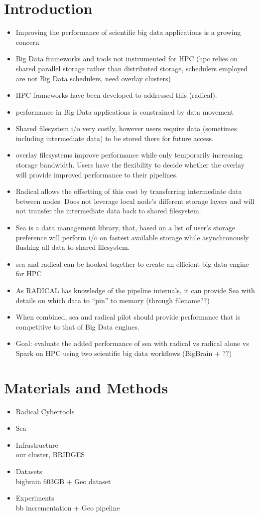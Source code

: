 \documentclass[conference]{IEEEtran}
\begin{document}
\section{Introduction}
\begin{itemize}
\item Improving the performance of scientific big data applications is a growing 
    concern
\item Big Data frameworks and tools not instrumented for HPC (hpc relies on 
    shared parallel storage rather than distributed storage, schedulers employed 
are not Big Data schedulers, need overlay clusters)
\item HPC frameworks have been developed to addressed this (radical).
\item performance in Big Data applications is constrained by data movement
\item Shared filesystem i/o very costly, however users require data (sometimes 
    including intermediate data) to be stored there for future access.
\item overlay filesystems improve performance while only temporarily increasing
    storage bandwidth. Users have the flexibility to decide whether the overlay
    will provide improved performance to their pipelines.
\item Radical allows the offsetting of this cost by transferring intermediate
    data between nodes. Does not leverage local node's different storage layers
    and will not transfer the intermediate data back to shared filesystem.
\item Sea is a data management library, that, based on a list of user's storage 
    preference will perform i/o on fastest available storage while 
    asynchronously flushing all data to shared filesystem.
\item sea and radical can be hooked together to create an efficient big data
    engine for HPC
\item As RADICAL has knowledge of the pipeline internals, it can provide Sea
    with details on which data to ``pin'' to memory (through filename??)
\item When combined, sea and radical pilot should provide performance that is
    competitive to that of Big Data engines.
\item Goal: evaluate the added performance of sea with radical vs radical alone 
    vs Spark on HPC using two scientific big data workflows (BigBrain + ??)
\end{itemize}
\section{Materials and Methods}
\begin{itemize}
    \item{Radical Cybertools}
    \item{Sea}
    \item{Infrastructure} \\our cluster, BRIDGES
    \item{Datasets} \\ bigbrain 603GB + Geo dataset
    \item{Experiments} \\ bb incrementation + Geo pipeline
\end{itemize}
\end{document}
